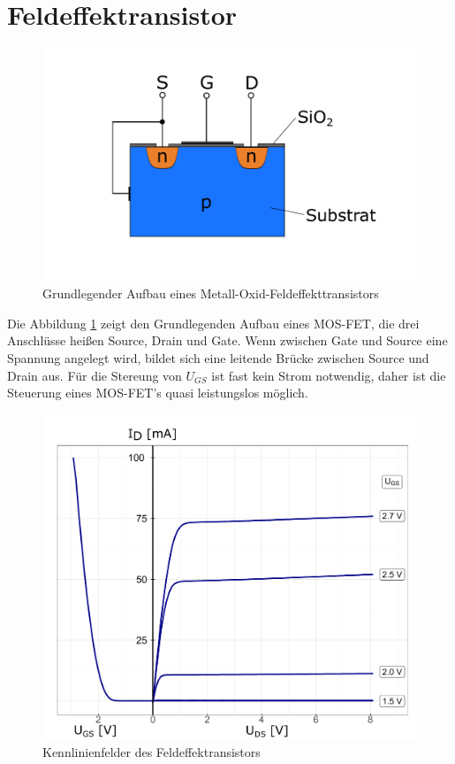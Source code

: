 \documentclass[12pt,a4paper,ngerman]{report}
\begin{document}
	\section{Feldeffektransistor}
	\begin{figure}[h]
		\centering
		\includegraphics[width=\textwidth]{plots/MosFET.pdf}
		\caption{Grundlegender Aufbau eines Metall-Oxid-Feldeffekttransistors}
		\label{img:MosFET}
	\end{figure}	
	Die Abbildung \ref{img:MosFET} zeigt den Grundlegenden Aufbau eines MOS-FET, die drei Anschlüsse heißen Source, Drain und Gate. Wenn zwischen Gate und Source eine Spannung angelegt wird, bildet sich eine leitende Brücke zwischen Source und Drain aus. Für die Stereung von $U_{GS}$ ist fast kein Strom notwendig, daher ist die Steuerung eines MOS-FET's quasi leistungslos möglich.\\
	\begin{figure}[h]
	\centering
	\includegraphics[width=\textwidth]{plots/FET.pdf}
	\caption{Kennlinienfelder des Feldeffektransistors}
	\label{img:FET}
	\end{figure}
\end{document}

